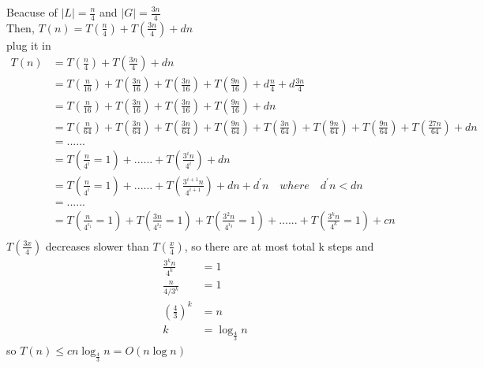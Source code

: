 \documentclass[12pt]{article}
\begin{document}
\newpage
{} Beacuse of $|L| = \frac{n}{4}$ and $|G| = \frac{3n}{4}$\\
Then, $T(n)=T(\frac{n}{4})+T(\frac{3n}{4})+dn$\\
plug it in\\
\begin{align*}
T(n)&=T(\frac{n}{4})+T(\frac{3n}{4})+dn\\
&= T(\frac{n}{16})+ T(\frac{3n}{16})+T(\frac{3n}{16}) +T(\frac{9n}{16})+d\frac{n}{4}+d\frac{3n}{4}\\
&= T(\frac{n}{16})+ T(\frac{3n}{16})+T(\frac{3n}{16}) +T(\frac{9n}{16})+dn\\
&= T(\frac{n}{64})+ T(\frac{3n}{64})+T(\frac{3n}{64}) +T(\frac{9n}{64})+T(\frac{3n}{64}) +T(\frac{9n}{64})+T(\frac{9n}{64})+T(\frac{27n}{64}) +dn\\
&=......\\
&= T(\frac{n}{4^{i}}=1) + ...... + T(\frac{3^{i}n}{4^{i}}) + dn \\
&= T(\frac{n}{4^{i}}=1) + ...... + T(\frac{3^{i+1}n}{4^{i+1}}) + dn +d^{'}n \quad where\quad d^{'}n < dn\\
&=......\\
&= T(\frac{n}{4^{i_{1}}}=1) + T(\frac{3n}{4^{i_{2}}}=1) + T(\frac{3^{2}n}{4^{i_{3}}}=1) + ...... + T(\frac{3^{k}n}{4^{k}}=1) + cn \\
\end{align*}
$T(\frac{3x}{4})$ decreases slower than $T(\frac{x}{4})$, so there are at most total k steps and
\begin{align*}
    \frac{3^{k}n}{4^{k}}&=1\\
    \frac{n}{4/3^k} &= 1\\
    (\frac{4}{3})^k &= n\\
    k &= \log_\frac{4}{3} n
\end{align*}
so $T(n)\le cn\log_\frac{4}{3} n = O(n\log n)$\\
\end{document}
